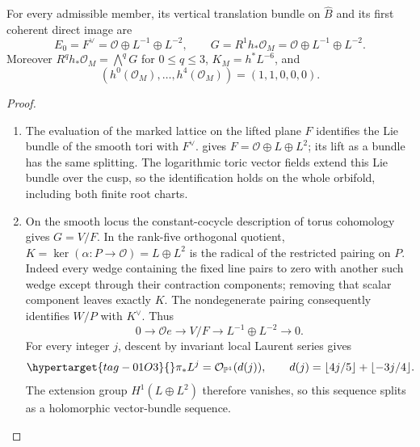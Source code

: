 \begin{theorem}\hypertarget{tag-02R1}{}\label{night:P1A.1}
For every admissible member, its vertical translation bundle on
$\widehat B$ and its first coherent direct image are
\[
 E_0=F^\vee=\mathcal O\oplus L^{-1}\oplus L^{-2},\qquad
 G=R^1h_*\mathcal O_M=\mathcal O\oplus L^{-1}\oplus L^{-2}.
\]
Moreover $R^qh_*\mathcal O_M=\bigwedge^qG$ for $0\le q\le3$,
$K_M=h^*L^{-6}$, and
\[
 (h^0(\mathcal O_M),\ldots,h^4(\mathcal O_M))=(1,1,0,0,0).
\]
\end{theorem}
\begin{proof}
\begin{enumerate}[label={$\langle1\rangle$\arabic*.}]
\item The evaluation of the marked lattice on the lifted plane $F$
identifies the Lie bundle of the smooth tori with $F^\vee$.
 gives $F=\mathcal O\oplus L\oplus L^2$; its lift as a bundle
has the same splitting. The logarithmic toric vector fields extend
this Lie bundle over the cusp, so the identification holds on the
whole orbifold, including both finite root charts.

\item On the smooth locus the constant-cocycle description of torus
cohomology gives $G=V/F$. In the rank-five orthogonal quotient,
$K=\ker(\alpha:P\to\mathcal O)=L\oplus L^2$ is the radical of
the restricted pairing on $P$. Indeed every wedge containing the
fixed line pairs to zero with another such wedge except through
their contraction components; removing that scalar component
leaves exactly $K$. The nondegenerate pairing consequently
identifies $W/P$ with $K^\vee$. Thus
\[
 0\longrightarrow\mathcal O e\longrightarrow V/F
   \longrightarrow L^{-1}\oplus L^{-2}\longrightarrow0.
\]
For every integer $j$, descent by invariant local Laurent series gives
\begin{equation}\hypertarget{tag-01O3}{}\label{eq:P1Adegree}
 \pi_*L^j=\mathcal O_{\mathbb P^1}(d(j)),\qquad
 d(j)=\lfloor4j/5\rfloor+\lfloor-3j/4\rfloor.
\end{equation}
The extension group $H^1(L\oplus L^2)$ therefore vanishes, so this
sequence splits as a holomorphic vector-bundle sequence.


\end{enumerate}
\end{proof}
